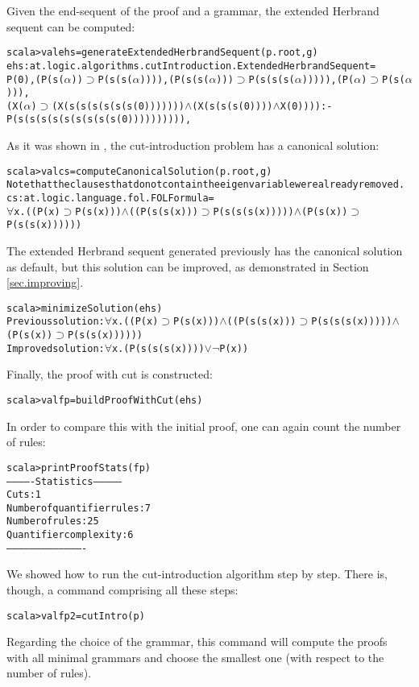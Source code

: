 \documentclass[a4paper, 11pt]{report}
\newcommand{\impl}{\supset}
\begin{document}
Given the end-sequent of the proof and a grammar, the extended Herbrand sequent can be computed:
{\small
  \begin{alltt}
    scala> val ehs = generateExtendedHerbrandSequent(p.root, g)
    ehs: at.logic.algorithms.cutIntroduction.ExtendedHerbrandSequent = 
    P(0), (P(s(\(\alpha\)))\(\impl\)P(s(s(\(\alpha\))))), (P(s(s(\(\alpha\))))\(\impl\)P(s(s(s(\(\alpha\)))))),(P(\(\alpha\))\(\impl\)P(s(\(\alpha\)))),
    (X(\(\alpha\))\(\impl\)(X(s(s(s(s(s(s(0)))))))\(\wedge\)(X(s(s(s(0))))\(\wedge\)X(0)))) :- 
    P(s(s(s(s(s(s(s(s(s(0)))))))))),
  \end{alltt}
}
As it was shown in \cite{cutIntro2013}, the cut-introduction problem has a
canonical solution:
{\small
  \begin{alltt}
    scala> val cs = computeCanonicalSolution(p.root, g)
    Note that the clauses that do not contain the eigenvariable were already removed.
    cs: at.logic.language.fol.FOLFormula = 
    \(\forall\)x.((P(x)\(\impl\)P(s(x)))\(\wedge\)((P(s(s(x)))\(\impl\)P(s(s(s(x)))))\(\wedge\)(P(s(x))\(\impl\)P(s(s(x))))))
  \end{alltt}
}
The extended Herbrand sequent generated previously has the canonical solution as
default, but this solution can be improved, as demonstrated in Section
\ref{sec.improving}. 
{\small
  \begin{alltt}
    scala> minimizeSolution(ehs)
Previous solution: \(\forall\)x.((P(x)\(\impl\)P(s(x)))\(\wedge\)((P(s(s(x)))\(\impl\)P(s(s(s(x)))))\(\wedge\)(P(s(x))\(\impl\)P(s(s(x))))))
Improved solution: \(\forall\)x.(P(s(s(s(x))))\(\vee \neg\)P(x))
\end{alltt}
}
Finally, the proof with cut is constructed:
{\small
\begin{alltt}
scala> val fp = buildProofWithCut(ehs)
\end{alltt}
}
In order to compare this with the initial proof, one can again count
the number of rules:
{\small
\begin{alltt}
scala> printProofStats(fp)
------------- Statistics ---------------
Cuts: 1
Number of quantifier rules: 7
Number of rules: 25
Quantifier complexity: 6
----------------------------------------
\end{alltt}
}
We showed how to run the cut-introduction algorithm step by step. There is,
though, a command comprising all these steps:
{\small
\begin{alltt}
scala> val fp2 = cutIntro(p)
\end{alltt}
}
Regarding the choice of the grammar, this command will compute the proofs with
all minimal grammars and choose the smallest one (with respect to the number of rules).
\end{document}

